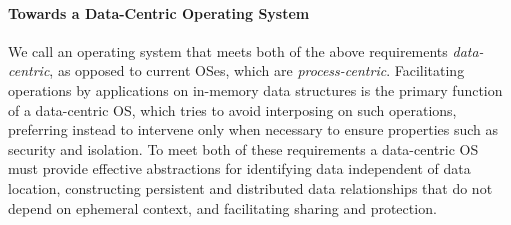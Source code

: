 \begin{chconc}
    \paragraph{Towards a Data-Centric Operating System}
    We call an operating system that meets both of the above requirements
    \emph{data-centric}, as opposed to current OSes, which are \emph{process-centric}.
    Facilitating
    operations by applications on in-memory data structures is the primary function of a data-centric OS,
    which tries to avoid interposing on such operations, preferring instead to intervene only when
    necessary to ensure properties such as security and isolation. To meet both of these requirements
    a data-centric OS must provide effective abstractions for identifying data independent
    of data location, constructing persistent and distributed data relationships that do not depend on ephemeral
    context, and facilitating sharing and protection.












\end{chconc}
